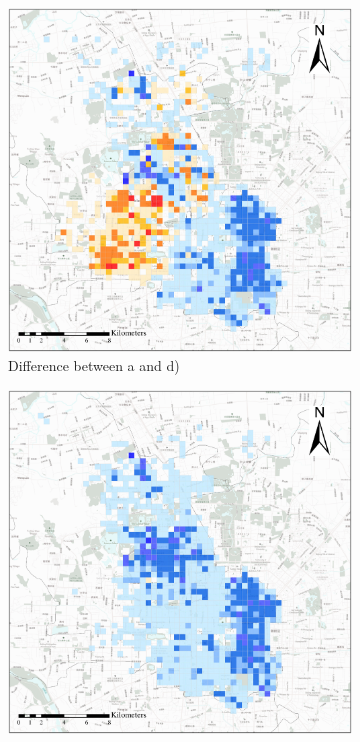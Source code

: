 \documentclass[preprints,ijgi,submit,moreauthors]{Definitions/mdpi}
\begin{document}
\begin{figure}[ht]
    \vspace{6pt}
    \begin{subfigure}{.28\textwidth}
        \includegraphics[width=\textwidth]{Figures/BSSMinusmp1.eps}
        \caption{Difference between a and d)}\label{fig:p_a_dif}
    \end{subfigure}
        \begin{subfigure}{.28\textwidth}
        \includegraphics[width=\textwidth]{Figures/BSSMinusmp2.eps}

\end{subfigure}
\end{figure}
\end{document}
